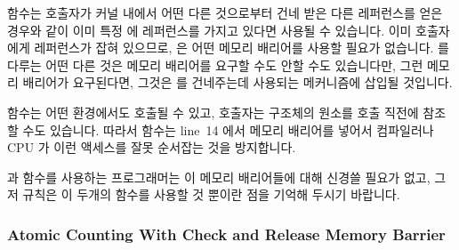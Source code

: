  함수는 호출자가 커널 내에서 어떤 다른 것으로부터 건네 받은
다른 레퍼런스를 얻은 경우와 같이 이미 특정  에 레퍼런스를 가지고
있다면 사용될 수 있습니다.
이미 호출자에게 레퍼런스가 잡혀 있으므로,  은 어떤 메모리
배리어를 사용할 필요가 없습니다.
 를 다루는 어떤 다른 것은 메모리 배리어를 요구할 수도 안할 수도
있습니다만, 그런 메모리 배리어가 요구된다면, 그것은  를
건네주는데 사용되는 메커니즘에 삽입될 것입니다.

 함수는 어떤 환경에서도 호출될 수 있고, 호출자는
 구조체의 원소를  호출 직전에 참조할 수도
있습니다.
따라서  함수는 line~14 에서 메모리 배리어를 넣어서 컴파일러나
CPU 가 이런 액세스를 잘못 순서잡는 것을 방지합니다.

 과  함수를 사용하는 프로그래머는 이 메모리
배리어들에 대해 신경쓸 필요가 없고, 그저 규칙은 이 두개의 함수를 사용할 것
뿐이란 점을 기억해 두시기 바랍니다.

\subsubsection{Atomic Counting With Check and Release Memory Barrier}
\label{sec:defer:Atomic Counting With Check and Release Memory Barrier}

